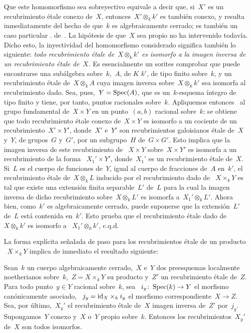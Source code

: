 Que este homomorfismo sea sobreyectivo equivale a decir que, si~$X'$ es un
recubrimiento étale conexo de~$X$, entonces~$X'\otimes_k k'$ es también
conexo, y resulta inmediatamente del hecho de que~$k$ es algebraicamente
cerrado; es también un caso particular
{.}
{de~.}
La hipótesis de que~$X$ sea propio no ha intervenido todavía. Dicho esto, la
inyectividad del homomorfismo considerado significa también lo siguiente:
\emph{todo recubrimiento étale de~$X\otimes_k k'$ es isomorfo a la imagen
inversa de un recubrimiento étale de~$X$.} Es esencialmente un sorites comprobar
que puede encontrarse una subálgebra sobre~$k$,~$A$, de
{$K$}
{$k'$},
de tipo finito sobre~$k$, y un recubrimiento étale de~$X\otimes_k A$ cuya
imagen inversa sobre~$X\otimes_k k'$ sea isomorfa al recubrimiento dado. Sea,
pues,~$Y=\operatorname{Spec}(A)$, que es un~$k$-esquema íntegro de tipo finito y tiene, por
tanto, puntos racionales sobre~$k$. Apliquemos entonces~ al grupo
fundamental de~$X\times Y$ en un punto~$(a,b)$ racional sobre~$k$: se obtiene
que todo recubrimiento étale conexo de~$X\times Y$ es isomorfo a un cociente
de un recubrimiento~$X'\times Y'$, donde~$X'$ e~$Y'$ son recubrimientos
galoisianos étale de~$X$ y~$Y$, de grupos~$G$ y~$G'$, por un subgrupo~$H$
de~$G\times G'$. Esto implica que la imagen inversa de este recubrimiento de
~$X\times Y$ sobre~$X\times Y'$ es isomorfa a un recubrimiento de la forma
~$X_1'\times Y'$, donde~$X_1'$ es un recubrimiento étale de~$X$. Si~$L$ es
el cuerpo de funciones de~$Y$, igual al cuerpo de fracciones de~$A$ en~$k'$,
el recubrimiento étale de~$X\otimes_k L$ inducido por el recubrimiento dado de
~$X\times_k Y$ es tal que existe una extensión finita separable~$L'$ de~$L$
para la cual la imagen inversa de dicho recubrimiento sobre~$X\otimes_k L'$
es isomorfa a~$X_1'\otimes_k L'$. Ahora bien, como~$k'$ es algebraicamente
cerrado, puede suponerse que la extensión~$L'$ de~$L$ está contenida en~$k'$.
Esto prueba que el recubrimiento étale dado de~$X\otimes_k k'$ es isomorfo a
~$X_1'\otimes_k k'$, c.q.d.

La forma explícita señalada de paso para los recubrimientos étale de un
producto
~$X\times_k Y$ implica de inmediato el resultado siguiente:

\begin{corollaire}
\label{X.1.9}
Sean~$k$ un cuerpo algebraicamente cerrado,~$X$ e~$Y$ dos preesquemas
localmente noetherianos sobre~$k$,~$Z=X\times_k Y$ su producto y~$Z'$ un
recubrimiento étale de~$Z$. Para todo punto~$y\in Y$ racional sobre~$k$, sea
~$i_y \colon \operatorname{Spec}(k)\to Y$ el morfismo canónicamente asociado,
~$j_y=\mathrm{id}_X\times_k i_y$ el morfismo correspondiente~$X\to Z$. Sea, por
último,~$X_y'$ el recubrimiento étale de~$X$ imagen inversa de~$Z'$ por~$j_y$.
Supongamos~$Y$ conexo y~$X$ o~$Y$ propio sobre~$k$. Entonces los
recubrimientos~$X_y'$ de~$X$ son todos isomorfos.
\end{corollaire}

